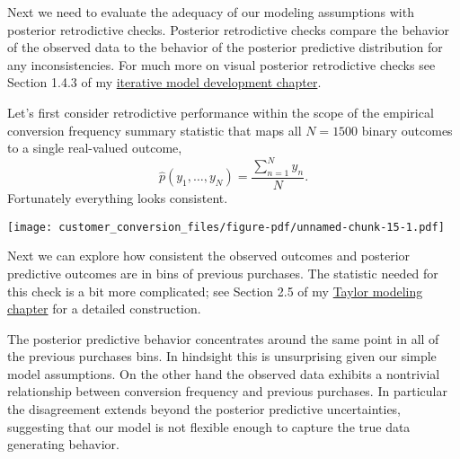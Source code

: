\documentclass[
  letterpaper,
  DIV=11,
  numbers=noendperiod]{scrartcl}
\newenvironment{Shaded}{\begin{snugshade}}{\end{snugshade}}
\newcommand{\AttributeTok}[1]{\textcolor[rgb]{0.40,0.45,0.13}{#1}}
\newcommand{\DecValTok}[1]{\textcolor[rgb]{0.68,0.00,0.00}{#1}}
\newcommand{\FunctionTok}[1]{\textcolor[rgb]{0.28,0.35,0.67}{#1}}
\newcommand{\NormalTok}[1]{\textcolor[rgb]{0.00,0.23,0.31}{#1}}
\newcommand{\SpecialCharTok}[1]{\textcolor[rgb]{0.37,0.37,0.37}{#1}}
\newcommand{\StringTok}[1]{\textcolor[rgb]{0.13,0.47,0.30}{#1}}
\begin{document}
Next we need to evaluate the adequacy of our modeling assumptions with
posterior retrodictive checks. Posterior retrodictive checks compare the
behavior of the observed data to the behavior of the posterior
predictive distribution for any inconsistencies. For much more on visual
posterior retrodictive checks see Section 1.4.3 of my
\href{https://betanalpha.github.io/assets/case_studies/principled_bayesian_workflow.html\#143_Posterior_Retrodiction_Checks}{iterative
model development chapter}.

Let's first consider retrodictive performance within the scope of the
empirical conversion frequency summary statistic that maps all
\(N = 1500\) binary outcomes to a single real-valued outcome, \[
\hat{p}(y_{1}, \ldots, y_{N}) = \frac{ \sum_{n = 1}^{N} y_{n} }{ N }.
\] Fortunately everything looks consistent.

\begin{Shaded}
\end{Shaded}

\texttt{[image: customer\_conversion\_files/figure-pdf/unnamed-chunk-15-1.pdf]}

Next we can explore how consistent the observed outcomes and posterior
predictive outcomes are in bins of previous purchases. The statistic
needed for this check is a bit more complicated; see Section 2.5 of my
\href{https://betanalpha.github.io/assets/case_studies/taylor_models.html\#25_Posterior_Retrodictive_Checks}{Taylor
modeling chapter} for a detailed construction.

The posterior predictive behavior concentrates around the same point in
all of the previous purchases bins. In hindsight this is unsurprising
given our simple model assumptions. On the other hand the observed data
exhibits a nontrivial relationship between conversion frequency and
previous purchases. In particular the disagreement extends beyond the
posterior predictive uncertainties, suggesting that our model is not
flexible enough to capture the true data generating behavior.
\end{document}
